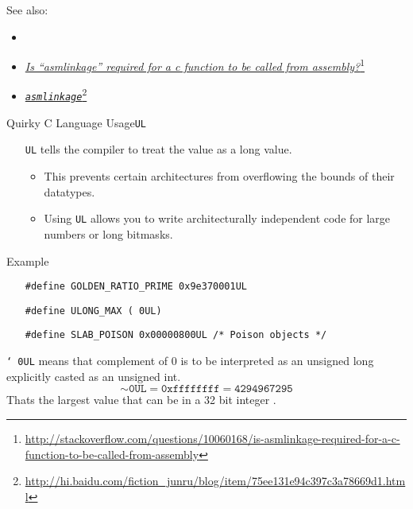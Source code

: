 See also:
\begin{itemize}
\item {}
\item
  \href{http://stackoverflow.com/questions/10060168/is-asmlinkage-required-for-a-c-function-to-be-called-from-assembly}{\emph{Is
      “asmlinkage”  required for a c function to be called from
    assembly?}}\footnote{\url{http://stackoverflow.com/questions/10060168/is-asmlinkage-required-for-a-c-function-to-be-called-from-assembly}}
\item \href{http://hi.baidu.com/fiction\_junru/blog/item/75ee131e94c397c3a78669d1.html}{\emph{\texttt{asmlinkage}}}\footnote{\url{http://hi.baidu.com/fiction_junru/blog/item/75ee131e94c397c3a78669d1.html}}
\end{itemize}

\begin{frame}[fragile=singleslide]{Quirky C Language Usage}{\texttt{UL}}
  \begin{itemize}
  \item[\texttt{UL}] tells the compiler to treat the value as a long value.
    \begin{itemize}
    \item This prevents certain architectures from overflowing the bounds of their datatypes.
    \item Using \texttt{UL} allows you to write architecturally independent code for large
      numbers or long bitmasks.
    \end{itemize}
  \end{itemize}
  \begin{block}{Example}
    \begin{itemize}
    \item[] \texttt{#define GOLDEN_RATIO_PRIME 0x9e370001UL}
    \item[] \texttt{#define ULONG_MAX (~0UL)}
    \item[] \texttt{#define SLAB_POISON 0x00000800UL /* Poison objects */}
    \end{itemize}
  \end{block}
\end{frame}

\texttt{\char`~0UL} means that complement of 0 is to be interpreted as an unsigned long
explicitly casted as an unsigned int.
$$\mathtt{\sim0UL = 0xffffffff = 4294967295}$$
Thats the largest value that can be in a 32 bit integer .

